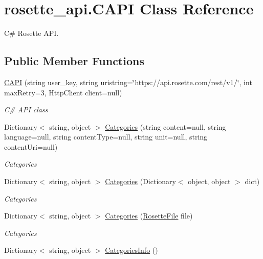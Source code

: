 \hypertarget{classrosette__api_1_1_c_a_p_i}{}\section{rosette\+\_\+api.\+C\+A\+P\+I Class Reference}
\label{classrosette__api_1_1_c_a_p_i}


C\# Rosette A\+P\+I.  


\subsection*{Public Member Functions}
\begin{DoxyCompactItemize}
\item 
\hyperlink{classrosette__api_1_1_c_a_p_i_ae547850ca1eedd3c8121a7a6b5ede9b7}{C\+A\+P\+I} (string user\+\_\+key, string uristring=\char`\"{}https\+://api.\+rosette.\+com/rest/v1/\char`\"{}, int max\+Retry=3, Http\+Client client=null)
\begin{DoxyCompactList}\small\item\em C\# A\+P\+I class \end{DoxyCompactList}\item 
Dictionary$<$ string, object $>$ \hyperlink{classrosette__api_1_1_c_a_p_i_a218b2b6cee592ca8869058e095df776c}{Categories} (string content=null, string language=null, string content\+Type=null, string unit=null, string content\+Uri=null)
\begin{DoxyCompactList}\small\item\em Categories \end{DoxyCompactList}\item 
Dictionary$<$ string, object $>$ \hyperlink{classrosette__api_1_1_c_a_p_i_aeac226a63205a1c7f9b0466fe542b723}{Categories} (Dictionary$<$ object, object $>$ dict)
\begin{DoxyCompactList}\small\item\em Categories \end{DoxyCompactList}\item 
Dictionary$<$ string, object $>$ \hyperlink{classrosette__api_1_1_c_a_p_i_af122d7a720ff547099f4deef3fa21d8e}{Categories} (\hyperlink{classrosette__api_1_1_rosette_file}{Rosette\+File} file)
\begin{DoxyCompactList}\small\item\em Categories \end{DoxyCompactList}\item 
Dictionary$<$ string, object $>$ \hyperlink{classrosette__api_1_1_c_a_p_i_a049d61bdb80e14925f4431a6d4709d0f}{Categories\+Info} ()

\end{DoxyCompactItemize}
